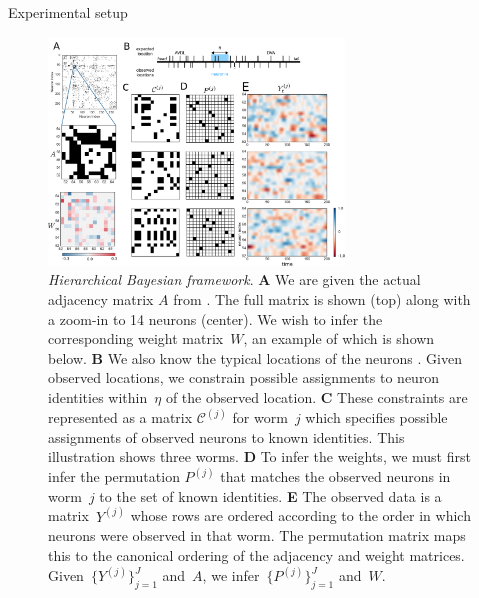 \documentclass[final]{beamer}
\begin{document}
\begin{frame}[allowframebreaks]
\begin{minipage}[htp][1\textheight][t]{\textwidth}
\begin{columns}[t]
\begin{column}{.5\linewidth}
\begin{block}{Experimental setup}
\begin{figure}[t]
  \centering
  \includegraphics[width=0.7\textwidth]{figs/Figure3.pdf} 
  \caption{\small \textit{Hierarchical Bayesian framework}.  \textbf{A} We
    are given the actual adjacency matrix $A$ from
    \cite{varshney2011structural}. The full matrix is shown (top)
    along with a zoom-in to 14 neurons (center).  We wish to infer the
    corresponding weight matrix~$W$, an example of which is shown
    below.  \textbf{B} We also know the typical locations of the
    neurons \cite{white1986structure,wormatlas}. 
    Given observed
    locations, we constrain possible assignments to neuron identities
    within~$\eta$ of the observed location.  \textbf{C} These
    constraints are represented as a matrix $\mathcal{C}^{(j)}$ for
    worm~$j$ which specifies possible assignments of observed neurons
    to known identities. This illustration shows three worms.
    \textbf{D} To infer the weights, we must first infer the
    permutation $P^{(j)}$ that matches the observed neurons in
    worm~$j$ to the set of known identities.  \textbf{E} The observed
    data is a matrix~$Y^{(j)}$ whose rows are ordered according to the
    order in which neurons were observed in that worm.  The
    permutation matrix maps this to the canonical ordering of the
    adjacency and weight matrices. Given~$\{Y^{(j)}\}_{j=1}^J$
    and~$A$, we infer~$\{P^{(j)}\}_{j=1}^J$ and~$W$.}

\label{fig:1}
\end{figure}



	   \end{block}
   	

\end{column}
\end{columns}
\end{minipage}
\end{frame}
\end{document}
